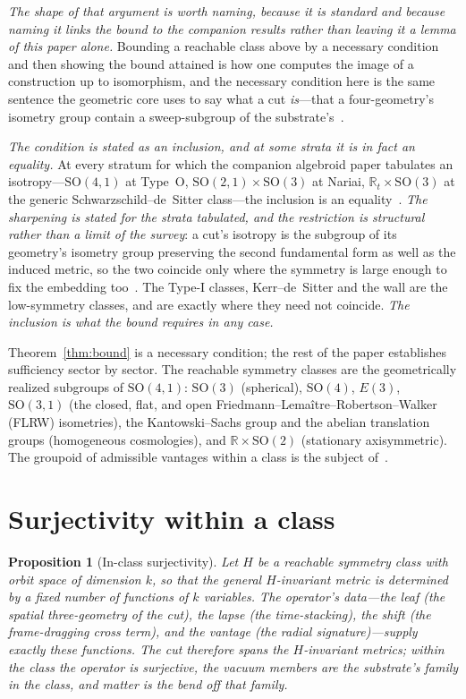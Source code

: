 \documentclass[11pt,a4paper]{article}
\newtheorem{proposition}[theorem]{Proposition}
\theoremstyle{definition}
\newcommand{\so}{\mathrm{SO}(4,1)}
\begin{document}
\emph{The shape of that argument is worth naming, because it is standard and because naming it links the bound to the companion results rather than leaving it a lemma of this paper alone.} Bounding a reachable class above by a necessary condition and then showing the bound attained is how one computes the image of a construction up to isomorphism, and the necessary condition here is the same sentence the geometric core uses to say what a cut \emph{is}---that a four-geometry's isometry group contain a sweep-subgroup of the substrate's~\cite{JanzenGeometricCore}.

\emph{The condition is stated as an inclusion, and at some strata it is in fact an equality.} At every stratum for which the companion algebroid paper tabulates an isotropy---$\mathrm{SO}(4,1)$ at Type~O, $\mathrm{SO}(2,1)\times\mathrm{SO}(3)$ at Nariai, $\mathbb{R}_{t}\times\mathrm{SO}(3)$ at the generic Schwarzschild--de~Sitter class---the inclusion is an equality~\cite{JanzenAlgebroid}. \emph{The sharpening is stated for the strata tabulated, and the restriction is structural rather than a limit of the survey}: a cut's isotropy is the subgroup of its geometry's isometry group preserving the second fundamental form as well as the induced metric, so the two coincide only where the symmetry is large enough to fix the embedding too~\cite{JanzenOperator}. The Type-I classes, Kerr--de~Sitter and the wall are the low-symmetry classes, and are exactly where they need not coincide. \emph{The inclusion is what the bound requires in any case.}

Theorem~\ref{thm:bound} is a necessary condition; the rest of the paper establishes sufficiency sector by sector. The reachable symmetry classes are the geometrically realized subgroups of $\so$: $\mathrm{SO}(3)$ (spherical), $\mathrm{SO}(4)$, $E(3)$, $\mathrm{SO}(3,1)$ (the closed, flat, and open Friedmann--Lemaître--Robertson--Walker (FLRW) isometries), the Kantowski--Sachs group and the abelian translation groups (homogeneous cosmologies), and $\mathbb{R}\times\mathrm{SO}(2)$ (stationary axisymmetric). The groupoid of admissible vantages within a class is the subject of~\cite{JanzenGroupoid}.

\section{Surjectivity within a class}\label{sec:surj}

\begin{proposition}[In-class surjectivity]\label{prop:surj}
Let $H$ be a reachable symmetry class with orbit space of dimension $k$, so that the general $H$-invariant metric is determined by a fixed number of functions of $k$ variables. The operator's data---the leaf (the spatial three-geometry of the cut), the lapse (the time-stacking), the shift (the frame-dragging cross term), and the vantage (the radial signature)---supply exactly these functions. The cut therefore spans the $H$-invariant metrics; within the class the operator is surjective, the vacuum members are the substrate's family in the class, and matter is the bend off that family.
\end{proposition}
\end{document}
